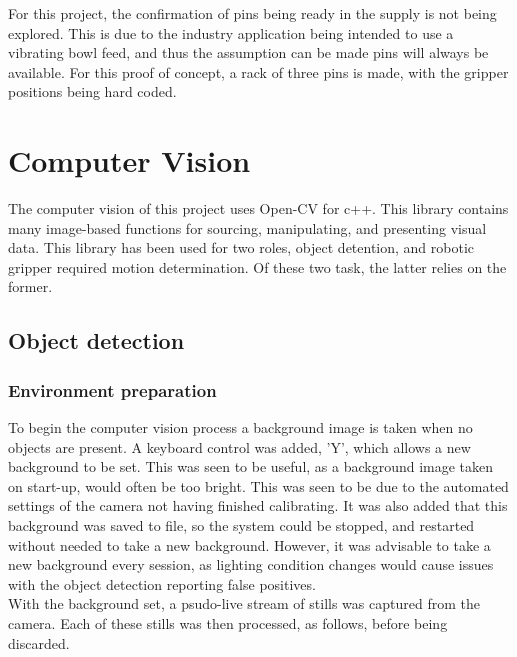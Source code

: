 \documentclass[11pt,a4paper]{report}
\begin{document}
For this project, the confirmation of pins being ready in the supply is not being explored. This is due to the industry application being intended to use a vibrating bowl feed, and thus the assumption can be made pins will always be available. For this proof of concept, a rack of three pins is made, with the gripper positions being hard coded.\\    


%


\chapter{Computer Vision}
The computer vision of this project uses Open-CV for c++. This library contains many image-based functions for sourcing, manipulating, and presenting visual data. This library has been used for two roles, object detention, and robotic gripper required motion determination. Of these two task, the latter relies on the former. 
\section{Object detection}
\subsection{Environment preparation}
To begin the computer vision process a background image is taken when no objects are present. A keyboard control was added, 'Y', which allows a new background to be set. This was seen to be useful, as a background image taken on start-up, would often be too bright. This was seen to be due to the automated settings of the camera not having finished calibrating. It was also added that this background was saved to file, so the system could be stopped, and restarted without needed to take a new background. However, it was advisable to take a new background every session, as lighting condition changes would cause issues with the object detection reporting false positives.\\
With the background set, a psudo-live stream of stills was captured from the camera. Each of these stills was then processed, as follows, before being discarded. 
\end{document}
